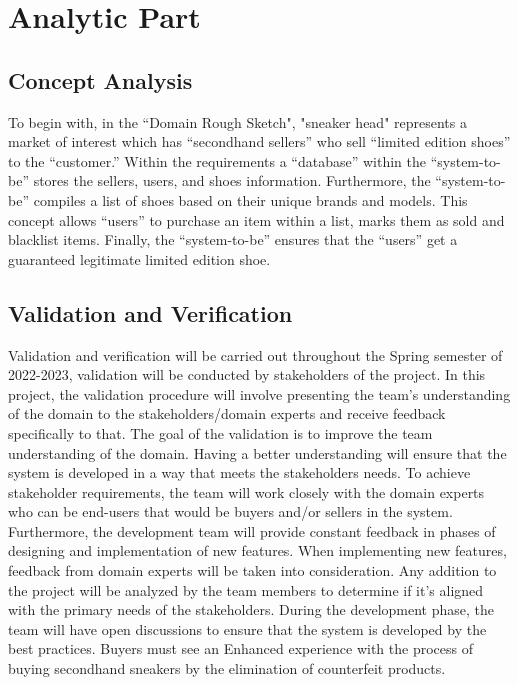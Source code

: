 \chapter{Analytic Part}
\newpage
\section{Concept Analysis}
\hspace{1cm} To begin with, in the “Domain Rough Sketch", 
"sneaker head" represents a market of interest which has “secondhand sellers” who sell “limited edition shoes” to the “customer.” 
Within the requirements a “database” within the “system-to-be” stores the sellers, users, and shoes information. 
Furthermore, the “system-to-be” compiles a list of shoes based on their unique brands and models. 
This concept allows “users” to purchase an item within a list, marks them as sold and blacklist items.
Finally, the “system-to-be” ensures that the “users” get a guaranteed legitimate limited edition shoe.
\section{Validation and Verification}
\hspace{1cm} Validation and verification will be carried out throughout the Spring semester of 2022-2023, validation will be conducted by stakeholders of the project. In this project, the validation procedure will involve presenting the team’s understanding of the domain to the stakeholders/domain experts and receive feedback specifically to that. The goal of the validation is to improve the team understanding of the domain. Having a better understanding will ensure that the system is developed in a way that meets the stakeholders needs. To achieve stakeholder requirements, the team will work closely with the domain experts who can be end-users that would be buyers and/or sellers in the system. Furthermore, the development team will provide constant feedback in phases of designing and implementation of new features. When implementing new features, feedback from domain experts will be taken into consideration. Any addition to the project will be analyzed by the team members to determine if it’s aligned with the primary needs of the stakeholders. During the development phase, the team will have open discussions to ensure that the system is developed by the best practices. Buyers must see an Enhanced experience with the process of buying secondhand sneakers by the elimination of counterfeit products.
